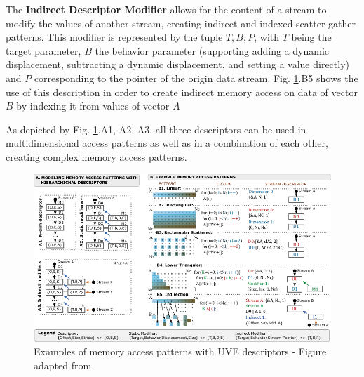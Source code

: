 The \textbf{Indirect Descriptor Modifier} allows for the content of a stream to modify the values of another stream, creating indirect and indexed scatter-gather patterns. This modifier is represented by the tuple ${T, B, P}$, with $T$ being the target parameter, $B$ the behavior parameter (supporting adding a dynamic displacement, subtracting a dynamic displacement, and setting a value directly) and $P$ corresponding to the pointer of the origin data stream. Fig. \ref{fig:stream-descriptors}.B5 shows the use of this description in order to create indirect memory access on data of vector $B$ by indexing it from values of vector $A$

As depicted by Fig. \ref{fig:stream-descriptors}.A1, A2, A3, all three descriptors can be used in multidimensional access patterns as well as in a combination of each other, creating complex memory access patterns.

\begin{figure}[H]
	\begin{center}
 		\includegraphics[width=.87\linewidth]{images/UVE-Descriptors.pdf}
 		\caption{Examples of memory access patterns with UVE descriptors - Figure adapted from \cite{uve-paper}}
 		\label{fig:stream-descriptors}
	\end{center} 
\end{figure}



